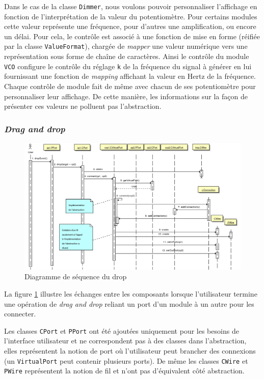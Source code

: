 Dans le cas de la classe \verb!Dimmer!, nous voulons pouvoir
personnaliser l'affichage en fonction de l'interprétation de la
valeur du potentiomètre. Pour certains modules cette valeur
représente une fréquence, pour d'autres une amplification, ou
encore un délai. Pour cela, le contrôle est associé à une fonction
de mise en forme (réifiée par la classe \verb!ValueFormat!),
chargée de \emph{mapper} une valeur numérique vers une
représentation sous forme de chaîne de caractères. Ainsi le
contrôle du module \verb!VCO! configure le contrôle du réglage
\verb!k! de la fréquence du signal à générer en lui fournissant une
fonction de \emph{mapping} affichant la valeur en Hertz de la
fréquence. Chaque contrôle de module fait de même avec chacun de
ses potentiomètre pour personnaliser leur affichage. De cette
manière, les informations sur la façon de présenter ces valeurs ne
polluent pas l'abstraction.

\subsubsection{\textit{Drag and drop}}

\begin{figure}[htb]
\centering
\includegraphics[width=16cm]{../img/ps/drop-sequence.pdf}
\caption{Diagramme de séquence du drop}
\label{drop-sequence}
\end{figure}

La figure \ref{drop-sequence} illustre les échanges entre les composants lorsque
l'utilisateur termine une opération de \emph{drag and drop} reliant
un port d'un module à un autre pour les connecter.

Les classes \verb!CPort! et \verb!PPort! ont été ajoutées
uniquement pour les besoins de l'interface utilisateur et ne
correspondent pas à des classes dans l'abstraction, elles
représentent la notion de port où l'utilisateur peut brancher des
connexions (un \verb!VirtualPort! peut contenir plusieurs ports).
De même les classes \verb!CWire! et \verb!PWire! représentent la
notion de fil et n'ont pas d'équivalent côté abstraction.

